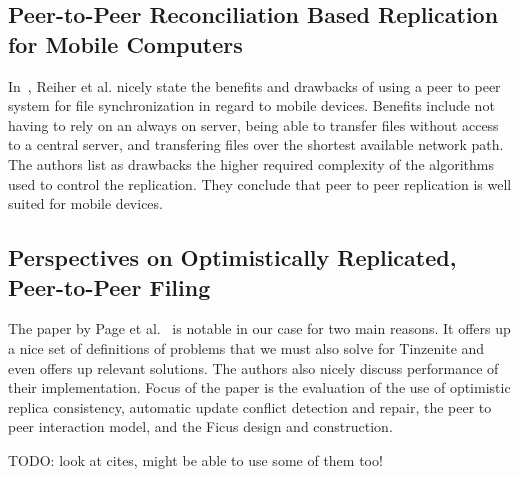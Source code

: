 \subsection{Peer-to-Peer Reconciliation Based Replication for Mobile Computers}
\label{sub:Peer-to-Peer Reconciliation Based Replication for Mobile Computers}

In~\cite{reiher1996peer}, Reiher et al. nicely state the benefits and drawbacks of using a peer to peer system for file synchronization in regard to mobile devices.
Benefits include not having to rely on an always on server, being able to transfer files without access to a central server, and transfering files over the shortest available network path.
The authors list as drawbacks the higher required complexity of the algorithms used to control the replication.
They conclude that peer to peer replication is well suited for mobile devices.

\subsection{Perspectives on Optimistically Replicated, Peer-to-Peer Filing}
\label{sub:Perspectives on Optimistically Replicated, Peer-to-Peer Filing}

The paper by Page et al.~\cite{page1998perspectives} is notable in our case for two main reasons.
It offers up a nice set of definitions of problems that we must also solve for Tinzenite and even offers up relevant solutions.
The authors also nicely discuss performance of their implementation.
Focus of the paper is the evaluation of the use of optimistic replica consistency, automatic update conflict detection and repair, the peer to peer interaction model, and the Ficus design and construction.

TODO: look at cites, might be able to use some of them too!

